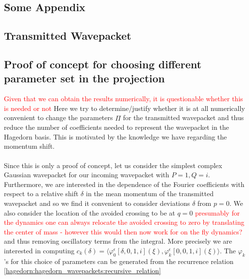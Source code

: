 \documentclass[12pt]{article}
\numberwithin{equation}{section}
\begin{document}
  \newpage
  \printbibliography
  \begin{appendices}
  \chapter{Some Appendix}
  \section{Transmitted Wavepacket}
    
\section{Proof of concept for choosing different parameter set in the 
        projection}
\textcolor{red}{Given that we can obtain the results numerically, 
it is questionable whether this is needed or not}
Here we try to determine/justify whether it is at all 
numerically convenient to change the parameters $\hat{\Pi}$ 
for the transmitted wavepacket and thus reduce the number 
of coefficients needed to represent the wavepacket in the 
Hagedorn basis. This is motivated by the knowledge we have 
regarding the momentum shift.
\\
\\
Since this is only a proof of concept, let us consider the 
simplest complex Gaussian wavepacket for our incoming 
wavepacket with $P = 1, Q = i$. 
Furthermore, we are interested in the dependence of the 
Fourier coefficients with respect to a relative shift $\delta$
in the mean momentum of the transmitted wavepacket and so we 
find it convenient to consider deviations $\delta$ from 
$p = 0$. We also consider the location 
of the avoided crossing to be at $q=0$ 
\textcolor{red}{presumably for the dynamics one can always 
  relocate the avoided crossing to zero by translating the center of mass 
- however this would then now work for on the fly dynamics?}
and thus removing oscillatory terms from the integral.
More precisely we are interested in computing 
$c_k(\delta) = \langle \varphi_0^\epsilon[\delta,0,1,i](\xi),
\varphi_k^\epsilon[0,0,1,i](\xi)  \rangle$. The $\varphi_k$'s 
for this choice of parameters can be generated from the 
recurrence relation
\eqref{hagedorn:hagedorn_wavepackets:recursive_relation}

\end{appendices}
\end{document}
